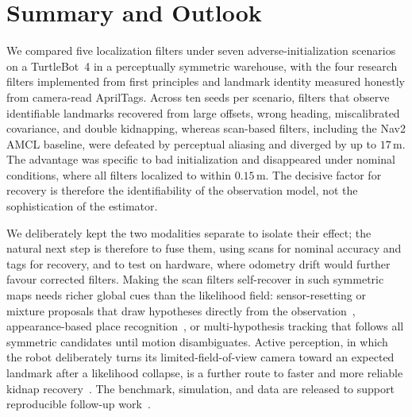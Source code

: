 \documentclass[conference]{IEEEtran}
\begin{document}
\section{Summary and Outlook}

We compared five localization filters under seven adverse-initialization scenarios on a TurtleBot~4 in a perceptually symmetric warehouse, with the four research filters implemented from first principles and landmark identity measured honestly from camera-read AprilTags. Across ten seeds per scenario, filters that observe identifiable landmarks recovered from large offsets, wrong heading, miscalibrated covariance, and double kidnapping, whereas scan-based filters, including the Nav2 AMCL baseline, were defeated by perceptual aliasing and diverged by up to $17$\,m. The advantage was specific to bad initialization and disappeared under nominal conditions, where all filters localized to within $0.15$\,m. The decisive factor for recovery is therefore the identifiability of the observation model, not the sophistication of the estimator.

We deliberately kept the two modalities separate to isolate their effect; the natural next step is therefore to fuse them, using scans for nominal accuracy and tags for recovery, and to test on hardware, where odometry drift would further favour corrected filters. Making the scan filters self-recover in such symmetric maps needs richer global cues than the likelihood field: sensor-resetting or mixture proposals that draw hypotheses directly from the observation~\cite{Thrun2005}, appearance-based place recognition~\cite{Cummins2008,Lowry2016}, or multi-hypothesis tracking that follows all symmetric candidates until motion disambiguates. Active perception, in which the robot deliberately turns its limited-field-of-view camera toward an expected landmark after a likelihood collapse, is a further route to faster and more reliable kidnap recovery~\cite{Cadena2016}. The benchmark, simulation, and data are released to support reproducible follow-up work~\cite{Kummerle2009}.

\clearpage
{\small


}
\end{document}
